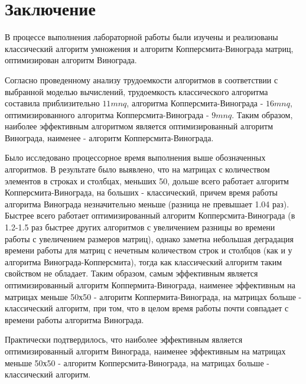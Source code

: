 \documentclass[a4paper,oneside,14pt]{extreport}
\begin{document}
\chapter*{Заключение}
В процессе выполнения лабораторной работы были изучены и реализованы классический алгоритм умножения и алгоритм Копперсмита-Винограда матриц, оптимизирован алгоритм Винограда.

Согласно проведенному анализу трудоемкости алгоритмов в соответствии с выбранной моделью вычислений, трудоемкость классического алгоритма составила приблизительно $11mnq$, алгоритма Копперсмита-Винограда - $16mnq$, оптимизированного алгоритма Копперсмита-Винограда - $9mnq$. Таким образом, наиболее эффективным алгоритмом является оптимизированный алгоритм Винограда, наименее - алгоритм Копперсмита-Винограда.

Было исследовано процессорное время выполнения выше обозначенных алгоритмов. В результате было выявлено, что на матрицах с количеством элементов в строках и столбцах, меньших 50, дольше всего работает алгоритм Копперсмита-Винограда, на больших - классический, причем время работы алгоритма Винограда незначительно меньше (разница не превышает 1.04 раз). Быстрее всего работает оптимизированный алгоритм Копперсмита-Винограда (в 1.2-1.5 раз быстрее других алгоритмов с увеличением разницы во времени работы с увеличением размеров матриц), однако заметна небольшая деградация времени работы для матриц с нечетным количеством строк и столбцов (как и у алгоритма Винограда-Копперсмита), тогда как классический алгоритм таким свойством не обладает. Таким образом, самым эффективным является оптимизированный алгоритм Коппермита-Винограда, наименее эффективным на матрицах меньше 50х50 - алгоритм Коппермита-Винограда, на матрицах больше - классический алгоритм, при том, что в целом время работы почти совпадает с времени работы алгоритма Винограда.

Практически подтвердилось, что наиболее эффективным является оптимизированный алгоритм Винограда, наименее эффективным на матрицах меньше 50х50 - алгоритм Копперсмита-Винограда, на матрицах больше - классический алгоритм.
\newpage
{}



\nocite{*}
\end{document}
